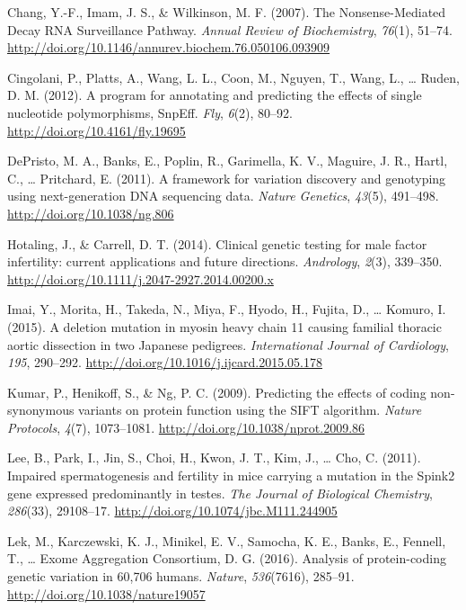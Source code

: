 \documentclass[12pt,twoside]{reedthesis}
\theoremstyle{definition}
\theoremstyle{definition}
\theoremstyle{remark}
\begin{document}
  \hypertarget{ref-Chang2007}{}
  Chang, Y.-F., Imam, J. S., \& Wilkinson, M. F. (2007). The
  Nonsense-Mediated Decay RNA Surveillance Pathway. \emph{Annual Review of
  Biochemistry}, \emph{76}(1), 51--74.
  \url{http://doi.org/10.1146/annurev.biochem.76.050106.093909}
  
  \hypertarget{ref-Cingolani2012}{}
  Cingolani, P., Platts, A., Wang, L. L., Coon, M., Nguyen, T., Wang, L.,
  \ldots{} Ruden, D. M. (2012). A program for annotating and predicting
  the effects of single nucleotide polymorphisms, SnpEff. \emph{Fly},
  \emph{6}(2), 80--92. \url{http://doi.org/10.4161/fly.19695}
  
  \hypertarget{ref-DePristo2011}{}
  DePristo, M. A., Banks, E., Poplin, R., Garimella, K. V., Maguire, J.
  R., Hartl, C., \ldots{} Pritchard, E. (2011). A framework for variation
  discovery and genotyping using next-generation DNA sequencing data.
  \emph{Nature Genetics}, \emph{43}(5), 491--498.
  \url{http://doi.org/10.1038/ng.806}
  
  \hypertarget{ref-Hotaling2014}{}
  Hotaling, J., \& Carrell, D. T. (2014). Clinical genetic testing for
  male factor infertility: current applications and future directions.
  \emph{Andrology}, \emph{2}(3), 339--350.
  \url{http://doi.org/10.1111/j.2047-2927.2014.00200.x}
  
  \hypertarget{ref-Imai2015}{}
  Imai, Y., Morita, H., Takeda, N., Miya, F., Hyodo, H., Fujita, D.,
  \ldots{} Komuro, I. (2015). A deletion mutation in myosin heavy chain 11
  causing familial thoracic aortic dissection in two Japanese pedigrees.
  \emph{International Journal of Cardiology}, \emph{195}, 290--292.
  \url{http://doi.org/10.1016/j.ijcard.2015.05.178}
  
  \hypertarget{ref-Kumar2009}{}
  Kumar, P., Henikoff, S., \& Ng, P. C. (2009). Predicting the effects of
  coding non-synonymous variants on protein function using the SIFT
  algorithm. \emph{Nature Protocols}, \emph{4}(7), 1073--1081.
  \url{http://doi.org/10.1038/nprot.2009.86}
  
  \hypertarget{ref-Lee2011}{}
  Lee, B., Park, I., Jin, S., Choi, H., Kwon, J. T., Kim, J., \ldots{}
  Cho, C. (2011). Impaired spermatogenesis and fertility in mice carrying
  a mutation in the Spink2 gene expressed predominantly in testes.
  \emph{The Journal of Biological Chemistry}, \emph{286}(33), 29108--17.
  \url{http://doi.org/10.1074/jbc.M111.244905}
  
  \hypertarget{ref-Lek2016}{}
  Lek, M., Karczewski, K. J., Minikel, E. V., Samocha, K. E., Banks, E.,
  Fennell, T., \ldots{} Exome Aggregation Consortium, D. G. (2016).
  Analysis of protein-coding genetic variation in 60,706 humans.
  \emph{Nature}, \emph{536}(7616), 285--91.
  \url{http://doi.org/10.1038/nature19057}
  
\end{document}
